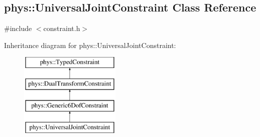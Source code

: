 \hypertarget{classphys_1_1UniversalJointConstraint}{
\subsection{phys::UniversalJointConstraint Class Reference}
\label{classphys_1_1UniversalJointConstraint}
}


{\ttfamily \#include $<$constraint.h$>$}

Inheritance diagram for phys::UniversalJointConstraint:\begin{figure}[H]
\begin{center}
\leavevmode
\includegraphics[height=4.000000cm]{classphys_1_1UniversalJointConstraint}
\end{center}
\end{figure}
